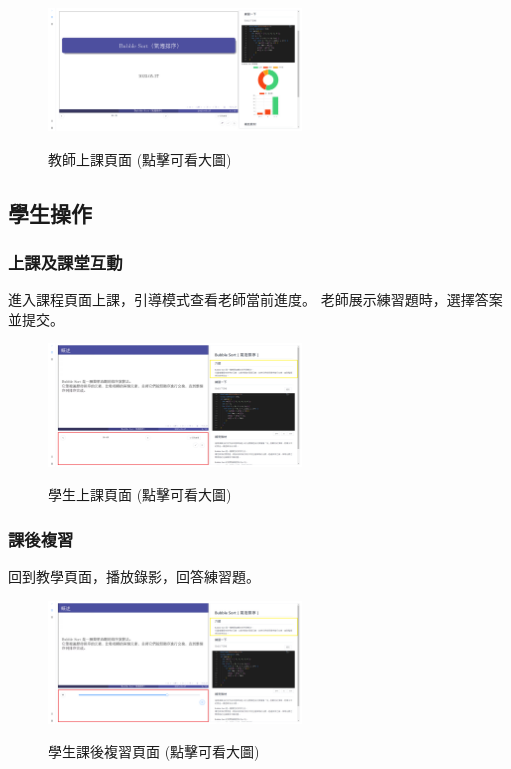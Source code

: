\documentclass[12pt]{article}
\begin{document}
\begin{figure}[H]
  \centering
  \href{https://raw.githubusercontent.com/programingtw/proglearn-plan/main/2023全國大專校院智慧創新暨跨域整合創作競賽/img/teacher.png}{
    \includegraphics[width=0.60\textwidth]{./img/teacher.png}
  }
  \caption{教師上課頁面 (點擊可看大圖)}
\end{figure}

\subsection{學生操作}
\subsubsection{上課及課堂互動}
進入課程頁面上課，引導模式查看老師當前進度。
老師展示練習題時，選擇答案並提交。

\begin{figure}[H]
  \centering
  \href{https://raw.githubusercontent.com/programingtw/proglearn-plan/main/2023全國大專校院智慧創新暨跨域整合創作競賽/img/student2.png}{
    \includegraphics[width=0.60\textwidth]{./img/student2.png}
  }
  \caption{學生上課頁面 (點擊可看大圖)}
\end{figure}

\subsubsection{課後複習}
回到教學頁面，播放錄影，回答練習題。

\begin{figure}[H]
  \centering
  \href{https://raw.githubusercontent.com/programingtw/proglearn-plan/main/2023全國大專校院智慧創新暨跨域整合創作競賽/img/student3.png}{
    \includegraphics[width=0.60\textwidth]{./img/student3.png}
  }
  \caption{學生課後複習頁面 (點擊可看大圖)}
\end{figure}
  
\end{document}

